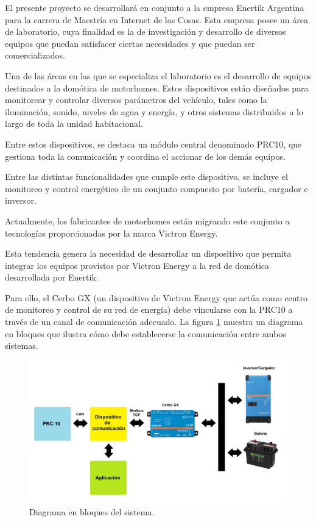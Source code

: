 \documentclass[
11pt, %
]{charter}
\begin{document}
El presente proyecto se desarrollará en conjunto a la empresa Enertik Argentina para la carrera de Maestría en Internet de las Cosas. Esta empresa posee un área de laboratorio, cuya finalidad es la de investigación y desarrollo de diversos equipos que puedan satisfacer ciertas necesidades y que puedan ser comercializados.

Una de las áreas en las que se especializa el laboratorio es el desarrollo de equipos destinados a la domótica de motorhomes. Estos dispositivos están diseñados para monitorear y controlar diversos parámetros del vehículo, tales como la iluminación, sonido, niveles de agua y energía, y otros sistemas distribuidos a lo largo de toda la unidad habitacional.

Entre estos dispositivos, se destaca un módulo central denominado PRC10, que gestiona toda la comunicación y coordina el accionar de los demás equipos.

Entre las distintas funcionalidades que cumple este dispositivo, se incluye el monitoreo y control energético de un conjunto compuesto por batería, cargador e inversor.
 
Actualmente, los fabricantes de motorhomes están migrando este conjunto a tecnologías proporcionadas por la marca Victron Energy. 
 
Esta tendencia genera la necesidad de desarrollar un dispositivo que permita integrar los equipos provistos por Victron Energy a la red de domótica desarrollada por Enertik.

Para ello, el Cerbo GX (un dispositivo de Victron Energy que actúa como centro de monitoreo y control de su red de energía) debe vincularse con la PRC10 a través de un canal de comunicación adecuado. La figura \ref{fig:esquema} muestra un diagrama en bloques que ilustra cómo debe establecerse la comunicación entre ambos sistemas.

\begin{figure}[htpb]
\centering 
\includegraphics[width=\textwidth]{./Figuras/esquema.png}
\caption{Diagrama en bloques del sistema.}
\label{fig:esquema}
\end{figure}
\end{document}
